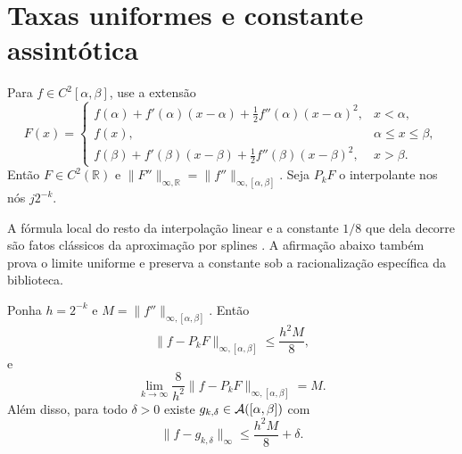 \section{Taxas uniformes e constante assintótica}
\label{sec:rates}

Para $f\in C^2[\alpha,\beta]$, use a extensão
\begin{equation}
F(x)=
\begin{cases}
f(\alpha)+f'(\alpha)(x-\alpha)+\tfrac12f''(\alpha)(x-\alpha)^2,&x<\alpha,\\
f(x),&\alpha\le x\le\beta,\\
f(\beta)+f'(\beta)(x-\beta)+\tfrac12f''(\beta)(x-\beta)^2,&x>\beta.
\end{cases}
\label{eq:c2-extension}
\end{equation}
Então $F\in C^2(\mathbb{R})$ e $\|F''\|_{\infty,\mathbb{R}}=\|f''\|_{\infty,[\alpha,\beta]}$. Seja $P_kF$ o interpolante nos nós $j2^{-k}$.

A fórmula local do resto da interpolação linear e a constante $1/8$ que dela
decorre são fatos clássicos da aproximação por splines
\citep{deboor2001,powell1981,schumaker2007}. A afirmação abaixo também prova o
limite uniforme e preserva a constante sob a racionalização específica da
biblioteca.

\begin{theorem}\label{thm:uniform}
Ponha $h=2^{-k}$ e $M=\|f''\|_{\infty,[\alpha,\beta]}$. Então
\begin{equation}
 \|f-P_kF\|_{\infty,[\alpha,\beta]}\le\frac{h^2M}{8},
 \label{eq:uniform-bound}
\end{equation}
e
\begin{equation}
 \lim_{k\to\infty}\frac{8}{h^2}\|f-P_kF\|_{\infty,[\alpha,\beta]}=M.
 \label{eq:uniform-limit}
\end{equation}
Além disso, para todo $\delta>0$ existe $g_{k,\delta}\in\mathcal{A}([\alpha,\beta])$ com
\begin{equation}
 \|f-g_{k,\delta}\|_\infty\le\frac{h^2M}{8}+\delta.
 \label{eq:rational-rate}
\end{equation}
\end{theorem}


